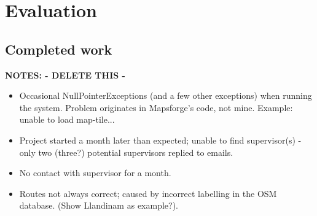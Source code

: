 \chapter{Evaluation}





\section{Completed work}
\textbf{NOTES: - DELETE THIS -}
\begin{itemize}
	\item Occasional NullPointerExceptions (and a few other exceptions) when running the system. Problem originates in Mapsforge's code, not mine. Example: unable to load map-tile...
	\item Project started a month later than expected; unable to find supervisor(s) - only two (three?) potential supervisors replied to emails.
	\item No contact with supervisor for a month.
	\item Routes not always correct; caused by incorrect labelling in the OSM database. (Show Llandinam as example?).
\end{itemize}



